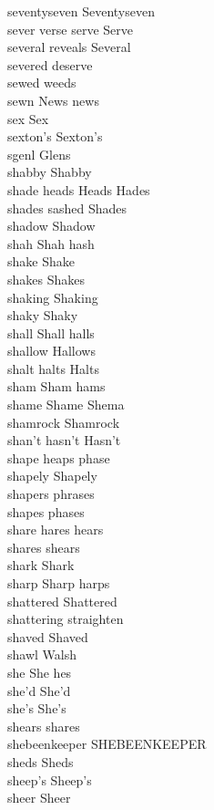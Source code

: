 seventyseven Seventyseven\\
sever verse serve Serve\\
several reveals Several\\
severed deserve\\
sewed weeds\\
sewn News news\\
sex Sex\\
sexton's Sexton's\\
sgenl Glens\\
shabby Shabby\\
shade heads Heads Hades\\
shades sashed Shades\\
shadow Shadow\\
shah Shah hash\\
shake Shake\\
shakes Shakes\\
shaking Shaking\\
shaky Shaky\\
shall Shall halls\\
shallow Hallows\\
shalt halts Halts\\
sham Sham hams\\
shame Shame Shema\\
shamrock Shamrock\\
shan't hasn't Hasn't\\
shape heaps phase\\
shapely Shapely\\
shapers phrases\\
shapes phases\\
share hares hears\\
shares shears\\
shark Shark\\
sharp Sharp harps\\
shattered Shattered\\
shattering straighten\\
shaved Shaved\\
shawl Walsh\\
she She hes\\
she'd She'd\\
she's She's\\
shears shares\\
shebeenkeeper SHEBEENKEEPER\\
sheds Sheds\\
sheep's Sheep's\\
sheer Sheer\\
